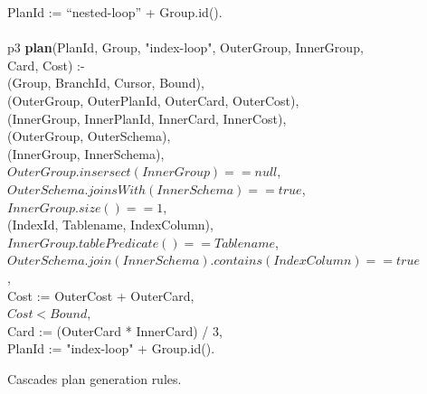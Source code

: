 \begin{figure}
\begin{boxedminipage}{\linewidth}
\datalogspace PlanId := ``nested-loop'' + Group.id(). \\
\\
p3 {\bf plan}(PlanId, Group, "index-loop", OuterGroup, InnerGroup, Card, Cost) :- \\
(Group, BranchId, Cursor, Bound), \\
(OuterGroup, OuterPlanId, OuterCard, OuterCost), \\
(InnerGroup, InnerPlanId, InnerCard, InnerCost), \\
(OuterGroup, OuterSchema), \\
(InnerGroup, InnerSchema), \\
\datalogspace $OuterGroup.insersect(InnerGroup) ==  null$, \\
\datalogspace $OuterSchema.joinsWith(InnerSchema) ==  true$, \\
\datalogspace $InnerGroup.size() == 1$, \\
(IndexId, Tablename, IndexColumn), \\
\datalogspace $InnerGroup.tablePredicate() == Tablename$, \\
\datalogspace $OuterSchema.join(InnerSchema).contains(IndexColumn) ==  true$, \\
\datalogspace Cost := OuterCost + OuterCard, \\
\datalogspace $Cost < Bound$, \\
\datalogspace Card := (OuterCard * InnerCard) / 3, \\ 
\datalogspace PlanId := "index-loop" + Group.id(). \\
  
\end{boxedminipage}
\caption{\label{ch:evita:fig:cascades_plan} Cascades plan generation rules.}
\end{figure}

